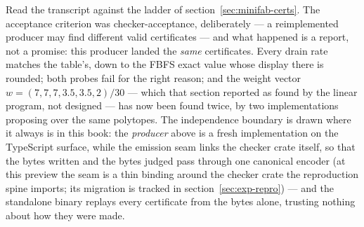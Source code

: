 Read the transcript against the ladder of
section~\ref{sec:minifab-certs}. The acceptance criterion was
checker-acceptance, deliberately --- a reimplemented producer may
find different valid certificates --- and what happened is a report,
not a promise: this producer landed the \emph{same} certificates.
Every drain rate matches the table's, down to the FBFS
exact value whose display there is rounded; both probes fail for the
right reason; and the weight vector $w = (7, 7, 7, 3.5, 3.5, 2)/30$
--- which that section reported as found by the linear program, not
designed --- has now been found twice, by two implementations
proposing over the same polytopes. The independence boundary is
drawn where it always is in this book: the \emph{producer} above is
a fresh implementation on the TypeScript surface, while the emission
seam links the checker crate itself, so that the bytes written and
the bytes judged pass through one canonical encoder (at this preview
the seam is a thin binding around the checker crate the reproduction
spine imports; its migration is tracked in section~\ref{sec:exp-repro}) --- and the standalone
binary replays every certificate from the bytes alone, trusting
nothing about how they were made.

